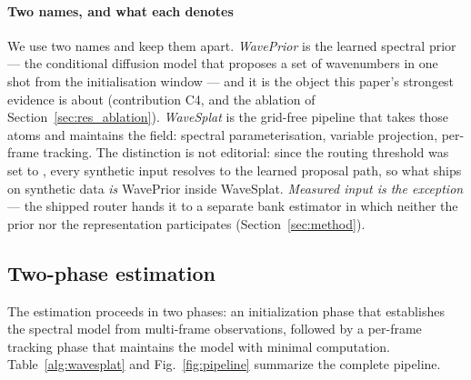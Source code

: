 \documentclass[review]{elsarticle}
\begin{document}
\paragraph{Two names, and what each denotes}
We use two names and keep them apart. \emph{WavePrior} is the learned spectral prior
--- the conditional diffusion model that proposes a set of wavenumbers in one shot
from the initialisation window --- and it is the object this paper's strongest
evidence is about (contribution C4, and the ablation of
Section~\ref{sec:res_ablation}). \emph{WaveSplat} is the grid-free pipeline that
takes those atoms and maintains the field: spectral parameterisation, variable
projection, per-frame tracking. The distinction is not editorial: since the routing
threshold was set to \DepAutoThresh{}, every synthetic input resolves to the learned
proposal path, so what ships on synthetic data \emph{is} WavePrior inside WaveSplat.
\emph{Measured input is the exception} --- the shipped router hands it to a separate
bank estimator in which neither the prior nor the representation participates
(Section~\ref{sec:method}).

\subsection{Two-phase estimation}

The estimation proceeds in two phases: an initialization phase that
establishes the spectral model from multi-frame observations, followed
by a per-frame tracking phase that maintains the model with
minimal computation.  Table~\ref{alg:wavesplat} and Fig.~\ref{fig:pipeline} summarize
the complete pipeline.
\end{document}

